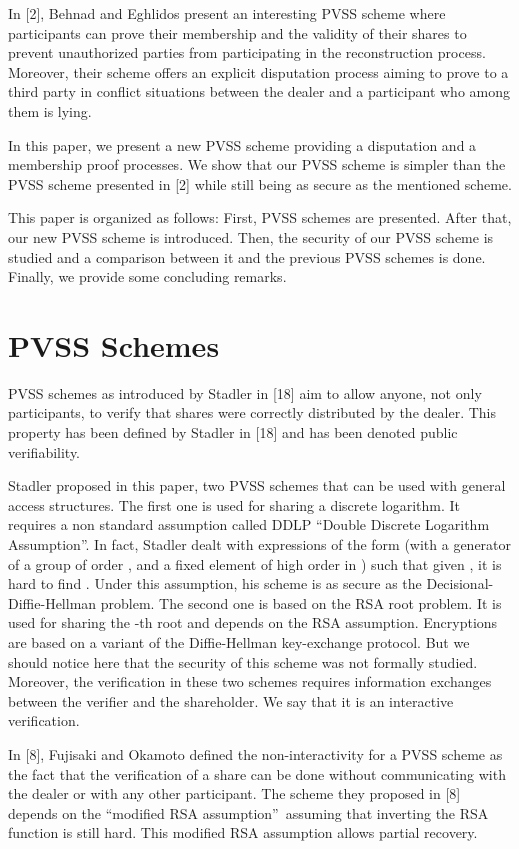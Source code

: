 \documentclass[submission,copyright,creativecommons]{eptcs}
\begin{document}
In [2], Behnad and Eghlidos present an interesting PVSS scheme where
participants can prove their membership and the validity of their shares to
prevent unauthorized parties from participating in the reconstruction
process. Moreover, their scheme offers an explicit disputation process
aiming to prove to a third party in conflict situations between the dealer
and a participant who among them is lying.

In this paper, we present a new PVSS scheme providing a disputation and a
membership proof processes. We show that our PVSS scheme is simpler than the
PVSS scheme presented in [2] while still being as secure as the mentioned
scheme.

This paper is organized as follows: First, PVSS schemes are presented. After
that, our new PVSS scheme is introduced. Then, the security of our PVSS
scheme is studied and a comparison between it and the previous PVSS schemes
is done. Finally, we provide some concluding remarks.

\section{PVSS Schemes}

PVSS schemes as introduced by Stadler in [18] aim to allow anyone, not only
participants, to verify that shares were correctly distributed by the
dealer. This property has been defined by Stadler in [18] and has been
denoted public verifiability.

Stadler proposed in this paper, two PVSS schemes that can be used with
general access structures. The first one is used for sharing a discrete
logarithm. It requires a non standard assumption called DDLP
\textquotedblleft Double Discrete Logarithm Assumption\textquotedblright .
In fact, Stadler dealt with expressions of the form  (with 
a generator of a group of order , and  a fixed element of high order
in ) such that given , it is hard to find . Under this
assumption, his scheme is as secure as the Decisional-Diffie-Hellman
problem. The second one is based on the RSA root problem. It is used for
sharing the -th root and depends on the RSA assumption. Encryptions are
based on a variant of the Diffie-Hellman key-exchange protocol. But we
should notice here that the security of this scheme was not formally
studied. Moreover, the verification in these two schemes requires
information exchanges between the verifier and the shareholder. We say that
it is an interactive verification.

In [8], Fujisaki and Okamoto defined the non-interactivity for a PVSS scheme
as the fact that the verification of a share can be done without
communicating with the dealer or with any other participant. The scheme they
proposed in [8] depends on the \textquotedblleft modified RSA
assumption\textquotedblright\ assuming that inverting the RSA function is
still hard. This modified RSA assumption allows partial recovery.
\end{document}
